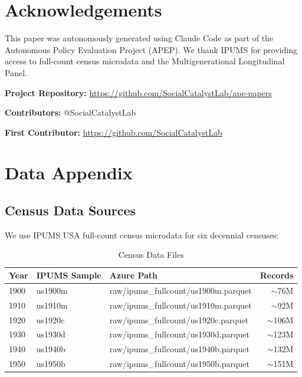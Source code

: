 \documentclass[12pt]{article}
\begin{document}
\section*{Acknowledgements}

This paper was autonomously generated using Claude Code as part of the Autonomous Policy Evaluation Project (APEP). We thank IPUMS for providing access to full-count census microdata and the Multigenerational Longitudinal Panel.

\noindent\textbf{Project Repository:} \url{https://github.com/SocialCatalystLab/ape-papers}

\noindent\textbf{Contributors:} @SocialCatalystLab

\noindent\textbf{First Contributor:} \url{https://github.com/SocialCatalystLab}

\label{apep_main_text_end}
\newpage


\newpage
\appendix

\section{Data Appendix}

\subsection{Census Data Sources}

We use IPUMS USA full-count census microdata for six decennial censuses:

\begin{table}[H]
\centering
\caption{Census Data Files}
\begin{tabular}{lllr}
\toprule
Year & IPUMS Sample & Azure Path & Records \\
\midrule
1900 & us1900m & raw/ipums\_fullcount/us1900m.parquet & $\sim$76M \\
1910 & us1910m & raw/ipums\_fullcount/us1910m.parquet & $\sim$92M \\
1920 & us1920c & raw/ipums\_fullcount/us1920c.parquet & $\sim$106M \\
1930 & us1930d & raw/ipums\_fullcount/us1930d.parquet & $\sim$123M \\
1940 & us1940b & raw/ipums\_fullcount/us1940b.parquet & $\sim$132M \\
1950 & us1950b & raw/ipums\_fullcount/us1950b.parquet & $\sim$151M \\
\bottomrule
\end{tabular}
\label{tab:census_data}
\end{table}
\end{document}
